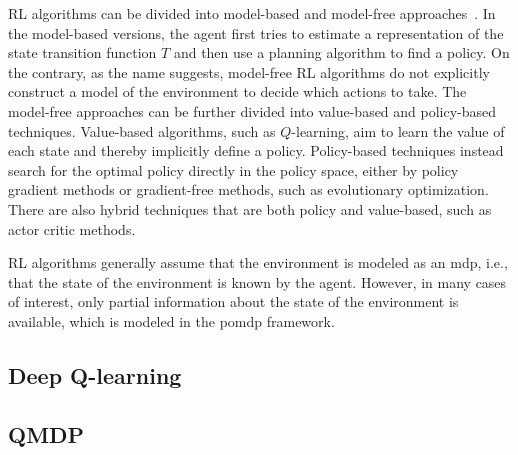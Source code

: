RL algorithms can be divided into model-based and model-free approaches~\cite[Ch. 5]{Kochenderfer2015}. In the model-based versions, the agent first tries to estimate a representation of the state transition function $T$ and then use a planning algorithm to find a policy. On the contrary, as the name suggests, model-free RL algorithms do not explicitly construct a model of the environment to decide which actions to take. 
The model-free approaches can be further divided into value-based and policy-based techniques. Value-based algorithms, such as $Q$-learning, aim to learn the value of each state and thereby implicitly define a policy. Policy-based techniques instead search for the optimal policy directly in the policy space, either by policy gradient methods or gradient-free methods, such as evolutionary optimization. There are also hybrid techniques that are both policy and value-based, such as actor critic methods.

RL algorithms generally assume that the environment is modeled as an \gls{mdp}, i.e., that the state of the environment is known by the agent. However, in many cases of interest, only partial information about the state of the environment is available, which is modeled in the \gls{pomdp} framework. %

\subsection{Deep Q-learning}
\subsection{QMDP}


